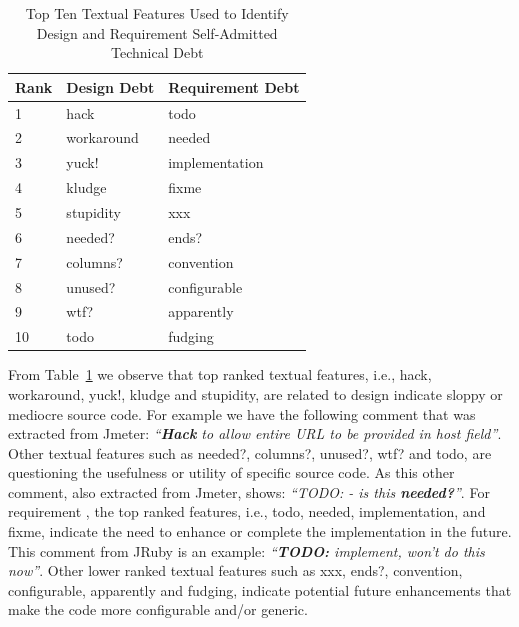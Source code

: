 \begin{table}[!thb]
    \begin{center}
        \caption{Top Ten Textual Features Used to Identify Design and Requirement Self-Admitted Technical Debt}
        \label{tbl:top_ten_features}
        \begin{tabular}{l| l l }
        \toprule
        \textbf{Rank} & \textbf{Design Debt} & \textbf{Requirement Debt}  \\
        \midrule
         1  & hack       &   todo              \\
         2  & workaround &   needed            \\
         3  & yuck!      &   implementation    \\
         4  & kludge     &   fixme             \\
         5  & stupidity  &   xxx               \\
         6  & needed?    &   ends?             \\
         7  & columns?   &   convention        \\
         8  & unused?    &   configurable      \\
         9  & wtf?       &   apparently        \\
         10 & todo       &   fudging           \\
        \bottomrule
        \end{tabular}
    \end{center}    
\end{table}

From Table~\ref{tbl:top_ten_features} we observe that top ranked textual features, i.e., hack, workaround, yuck!, kludge and stupidity, are related to design \SATD indicate sloppy or mediocre source code. For example we have the following comment that was extracted from Jmeter: \textit{``\textbf{Hack} to allow entire URL to be provided in host field''}. Other textual features such as needed?, columns?, unused?, wtf? and todo, are questioning the usefulness or utility of specific source code. As this other comment, also extracted from Jmeter, shows: \textit{``TODO: - is this \textbf{needed?}''}. For requirement \SATD, the top ranked features, i.e., todo, needed, implementation, and fixme, indicate the need to enhance or complete the implementation in the future. This comment from JRuby is an example: \textit{``\textbf{TODO:} implement, won't do this now''}. Other lower ranked textual features such as xxx, ends?, convention, configurable, apparently and fudging, indicate potential future enhancements that make the code more configurable and/or generic.

